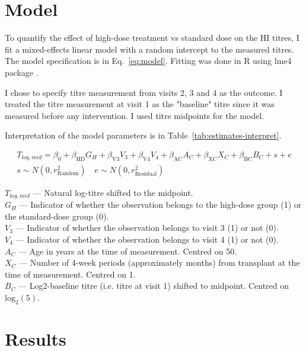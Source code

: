 \documentclass[11pt]{article}
\begin{document}
\section{Model}

To quantify the effect of high-dose treatment vs standard dose on the
HI titres, I fit a mixed-effects linear model with a random intercept
to the measured titres.
The model specification is in Eq.~\ref{eq:model}.
Fitting was done in R \cite{R} using lme4 package \cite{lme4}.

I chose to specify titre measurement from visits 2, 3 and 4 as the outcome.
I treated the titre measurement at visit 1 as the "baseline" titre since
it was measured before any intervention. I used titre midpoints for the model.

Interpretation of the model parameters is in
Table~\ref{tab:estimates-interpret}.

\begin{equation}
    \begin{gathered}
        \label{eq:model}
        T_{log,mid} = \beta_0 + \beta_{\text{HD}}G_H + \beta_{\text{V3}}V_3
        + \beta_{\text{V4}}V_4 + \beta_{\text{AC}}A_C
        + \beta_{\text{XC}}X_C + \beta_{\text{BC}}B_C
        + s + e\\
        s \sim N(0, r^2_{\text{Random}}) \quad e \sim N(0, r^2_{\text{Residual}})
    \end{gathered}
\end{equation}

$T_{log,mid}$ --- Natural log-titre shifted to the midpoint.\\
$G_H$ --- Indicator of whether the observation belongs to the
high-dose group (1) or the standard-dose group (0).\\
$V_3$ --- Indicator of whether the observation belongs to
visit 3 (1) or not (0).\\
$V_4$ --- Indicator of whether the observation belongs to
visit 4 (1) or not (0).\\
$A_C$ --- Age in years at the time of measurement. Centred on 50.\\
$X_C$ --- Number of 4-week periods (approximately months)
from transplant at the time of measurement. Centred on 1.\\
$B_C$ --- Log2-baseline titre (i.e. titre at visit 1) shifted to midpoint.
Centred on $\text{log}_2(5)$.



\section{Results}
\end{document}
